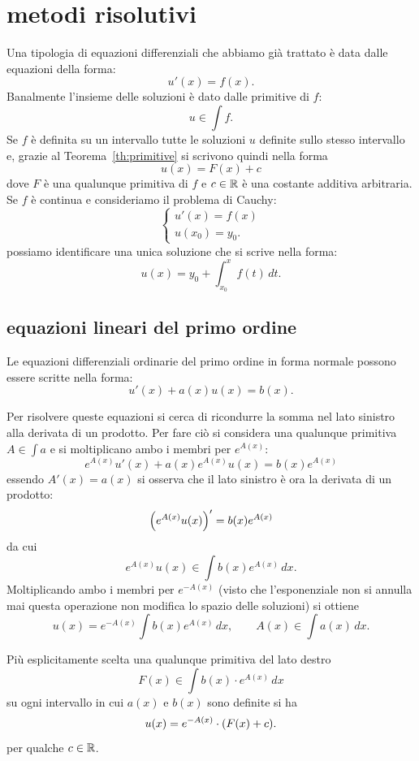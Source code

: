 \section{metodi risolutivi}

Una tipologia di equazioni differenziali che abbiamo già trattato
è data dalle equazioni della forma:
\[
   u'(x) = f(x).
\]
Banalmente l'insieme delle soluzioni è dato dalle primitive di $f$:
\[
  u \in \int f.
\]
Se $f$ è definita su un intervallo tutte le soluzioni $u$ definite sullo stesso
intervallo e, grazie al Teorema~\ref{th:primitive}
si scrivono quindi nella forma
\[
  u(x) = F(x) + c
\]
dove $F$ è una qualunque primitiva di $f$ e $c\in {\mathbb R}$ è una costante additiva
arbitraria.
Se $f$ è continua e consideriamo il problema di Cauchy:
\[
  \begin{cases}
    u'(x) = f(x) \\
    u(x_0) = y_0.
  \end{cases}
\]
possiamo identificare una unica soluzione
che si scrive nella forma:
\[
  u(x) = y_0 + \int_{x_0}^x f(t)\, dt.
\]

\subsection{equazioni lineari del primo ordine}

Le equazioni differenziali ordinarie del primo
ordine in forma normale possono essere scritte nella forma:
\mymark{***}
\begin{equation}\label{eq:47744}
   u'(x) + a(x) u(x) = b(x).
\end{equation}

Per risolvere queste equazioni si cerca di ricondurre la somma
nel lato sinistro alla derivata di un prodotto.
Per fare ciò si considera una qualunque primitiva
$A\in \int a$ e si moltiplicano ambo i membri
per $e^{A(x)}$:
\[
  e^{A(x)} u'(x) + a(x) e^{A(x)} u(x) = b(x) e^{A(x)}
\]
essendo $A'(x) = a(x)$
si osserva che il lato sinistro è ora la derivata di un prodotto:
\[
  {\left( e^{A(x)}u(x) \right)}' = b(x) e^{A(x)}
\]
da cui
\[
  e^{A(x)} u(x) \in \int b(x) e^{A(x)}\, dx.
\]
Moltiplicando ambo i membri per $e^{-A(x)}$ (visto che l'esponenziale
non si annulla mai questa operazione non modifica lo spazio delle soluzioni)
si ottiene
\[
u(x) = e^{-A(x)} \int b(x) e^{A(x)}\, dx, \qquad
A(x) \in \int a(x)\, dx.
\]

Più esplicitamente
scelta una qualunque primitiva del lato destro
\[
  F(x) \in \int b(x) \cdot e^{A(x)}\, dx
\]
su ogni intervallo in cui $a(x)$ e $b(x)$ sono definite
si ha
\[
  u(x) = e^{-A(x)}\cdot {\left( F(x) + c \right)}.
\]
per qualche $c\in {\mathbb R}$.

